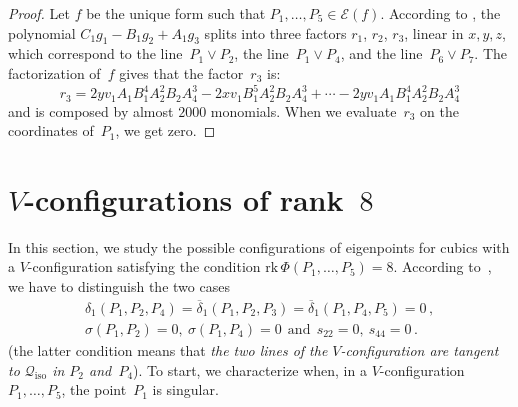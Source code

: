 \documentclass[a4paper, 11pt, reqno]{amsart}
\theoremstyle{plain}
\theoremstyle{definition}
\newcommand{\rk}{\ensuremath{\mathrm{rk}}}
\newcommand{\iso}{\mathcal{Q}_{\mathrm{iso}}}
\newcommand{\Eig}[1]{\mathcal{E}\!\left( {#1} \right)}
\begin{document}
\begin{proof}
Let $f$ be the unique form such that $P_1, \dotsc, P_5 \in \Eig{f}$.
According to , the polynomial
$C_1g_1-B_1g_2+A_1g_3$ splits into three factors $r_1$, $r_2$, $r_3$,
linear in $x, y, z$, which
correspond to the line~$P_1 \vee P_2$, the line~$P_1 \vee P_4$, and the line~$P_6 \vee P_7$.
The factorization of~$f$ gives that the factor~$r_3$ is:
%
\[
  r_3 = 2yv_1A_1B_1^4A_2^2B_2A_4^3-2xv_1B_1^5A_2^2B_2A_4^3+\cdots
  -2 yv_1A_1B_1^4A_2^2B_2A_4^3
\]
%
and is composed by almost $2000$ monomials. When we
evaluate~$r_3$ on the coordinates of~$P_1$, we get zero.
\end{proof}


\section{\texorpdfstring{$V$}{V}-configurations of rank~\texorpdfstring{$8$}{8}}
\label{rank_8}
%
In this section, we study the possible configurations of
eigenpoints for cubics with a $V$-configuration
satisfying the condition $\rk \, \Phi(P_1, \dots, P_5) = 8$. According
to~, we have to distinguish the two cases
%
\begin{gather}
  \delta_1(P_1, P_2, P_4)=\overline{\delta}_1(P_1, P_2, P_3) =
  \overline{\delta}_1(P_1, P_4, P_5) = 0 \,,
  \label{rk8_1} \\
  \sigma(P_1, P_2) = 0, \ \sigma(P_1, P_4) = 0 \ \ \mbox{and} \ \ s_{22} = 0,
  \ s_{44} = 0 \,.
  \label{rk8_2}
\end{gather}
%
(the latter condition means that \emph{the two lines of
the $V$-configuration are tangent to $\iso$ in $P_2$ and~$P_4$}).
%
To start, we characterize when, in a $V$-configuration
$P_1, \dotsc, P_5$, the point~$P_1$ is singular.
\end{document}
